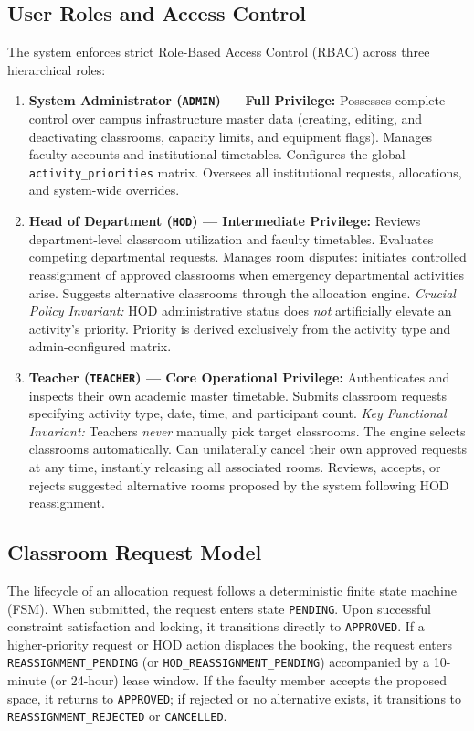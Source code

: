 \documentclass[conference]{IEEEtran}
\begin{document}
\subsection{User Roles and Access Control}
The system enforces strict Role-Based Access Control (RBAC) across three hierarchical roles:
\begin{enumerate}
    \item \textbf{System Administrator (\texttt{ADMIN}) --- Full Privilege:}
    Possesses complete control over campus infrastructure master data (creating, editing, and deactivating classrooms, capacity limits, and equipment flags). Manages faculty accounts and institutional timetables. Configures the global \texttt{activity\_priorities} matrix. Oversees all institutional requests, allocations, and system-wide overrides.
    \item \textbf{Head of Department (\texttt{HOD}) --- Intermediate Privilege:}
    Reviews department-level classroom utilization and faculty timetables. Evaluates competing departmental requests. Manages room disputes: initiates controlled reassignment of approved classrooms when emergency departmental activities arise. Suggests alternative classrooms through the allocation engine. \textit{Crucial Policy Invariant:} HOD administrative status does \textit{not} artificially elevate an activity's priority. Priority is derived exclusively from the activity type and admin-configured matrix.
    \item \textbf{Teacher (\texttt{TEACHER}) --- Core Operational Privilege:}
    Authenticates and inspects their own academic master timetable. Submits classroom requests specifying activity type, date, time, and participant count. \textit{Key Functional Invariant:} Teachers \textit{never} manually pick target classrooms. The engine selects classrooms automatically. Can unilaterally cancel their own approved requests at any time, instantly releasing all associated rooms. Reviews, accepts, or rejects suggested alternative rooms proposed by the system following HOD reassignment.
\end{enumerate}

\subsection{Classroom Request Model}
The lifecycle of an allocation request follows a deterministic finite state machine (FSM). When submitted, the request enters state \texttt{PENDING}. Upon successful constraint satisfaction and locking, it transitions directly to \texttt{APPROVED}. If a higher-priority request or HOD action displaces the booking, the request enters \texttt{REASSIGNMENT\_PENDING} (or \texttt{HOD\_REASSIGNMENT\_PENDING}) accompanied by a 10-minute (or 24-hour) lease window. If the faculty member accepts the proposed space, it returns to \texttt{APPROVED}; if rejected or no alternative exists, it transitions to \texttt{REASSIGNMENT\_REJECTED} or \texttt{CANCELLED}.
\end{document}
